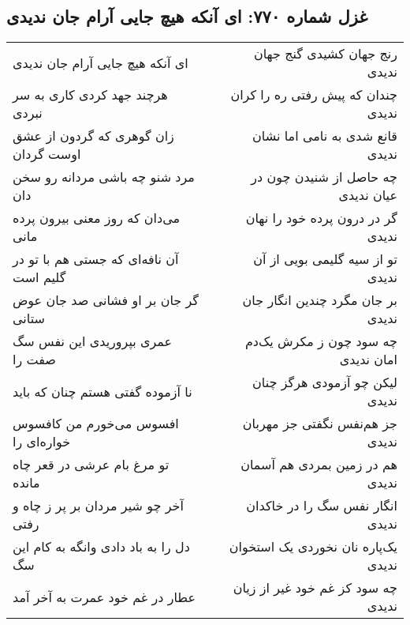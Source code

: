 \begin{center}
\section*{غزل شماره ۷۷۰: ای آنکه هیچ جایی آرام جان ندیدی}
\label{sec:770}
\begin{longtable}{l p{0.5cm} r}
ای آنکه هیچ جایی آرام جان ندیدی
&&
رنج جهان کشیدی گنج جهان ندیدی
\\
هرچند جهد کردی کاری به سر نبردی
&&
چندان که پیش رفتی ره را کران ندیدی
\\
زان گوهری که گردون از عشق اوست گردان
&&
قانع شدی به نامی اما نشان ندیدی
\\
مرد شنو چه باشی مردانه رو سخن دان
&&
چه حاصل از شنیدن چون در عیان ندیدی
\\
می‌دان که روز معنی بیرون پرده مانی
&&
گر در درون پرده خود را نهان ندیدی
\\
آن نافه‌ای که جستی هم با تو در گلیم است
&&
تو از سیه گلیمی بویی از آن ندیدی
\\
گر جان بر او فشانی صد جان عوض ستانی
&&
بر جان مگرد چندین انگار جان ندیدی
\\
عمری بپروریدی این نفس سگ صفت را
&&
چه سود چون ز مکرش یک‌دم امان ندیدی
\\
نا آزموده گفتی هستم چنان که باید
&&
لیکن چو آزمودی هرگز چنان ندیدی
\\
افسوس می‌خورم من کافسوس خواره‌ای را
&&
جز هم‌نفس نگفتی جز مهربان ندیدی
\\
تو مرغ بام عرشی در قعر چاه مانده
&&
هم در زمین بمردی هم آسمان ندیدی
\\
آخر چو شیر مردان بر پر ز چاه و رفتی
&&
انگار نفس سگ را در خاکدان ندیدی
\\
دل را به باد دادی وانگه به کام این سگ
&&
یک‌پاره نان نخوردی یک استخوان ندیدی
\\
عطار در غم خود عمرت به آخر آمد
&&
چه سود کز غم خود غیر از زیان ندیدی
\\
\end{longtable}
\end{center}
